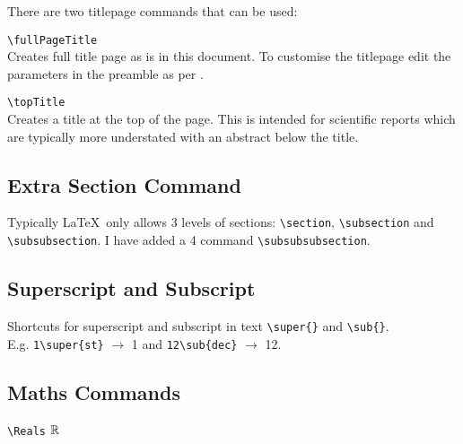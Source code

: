 \documentclass[a4paper, 12pt, english]{article}
\begin{document}
            There are two titlepage commands that can be used:

            \verb+\fullPageTitle+\\
            Creates full title page as is in this document. To customise the titlepage edit the parameters in the preamble as per .

            \verb+\topTitle+\\
            Creates a title at the top of the page. This is intended for scientific reports which are typically more understated with an abstract below the title.


        \subsection{Extra Section Command}
            \label{subsec: extra section command}

            Typically \LaTeX~only allows 3 levels of sections: \verb+\section+, \verb+\subsection+ and \verb+\subsubsection+. I have added a 4 command \verb+\subsubsubsection+.


        \subsection{Superscript and Subscript}
            \label{subsec: superscript and subscript}

            Shortcuts for superscript and subscript in text \verb+\super{}+ and \verb+\sub{}+.\\
            E.g. \verb+1\super{st}+ $\to$ 1 and \verb+12\sub{dec}+ $\to$ 12.


        \subsection{Maths Commands}
            \label{subsec: maths commands}

            \verb+\Reals+ $\mathbb{R}$
            
\end{document}
